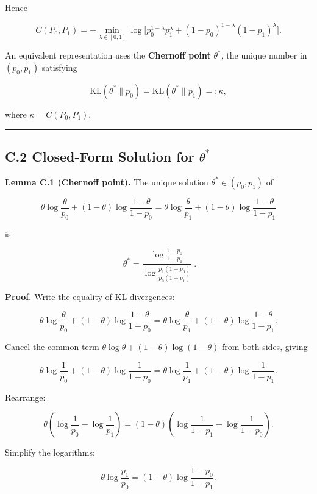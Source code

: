 \documentclass[
  12pt,
]{ctexart}
\begin{document}
Hence

\[
C(P_0,P_1) = -\min_{\lambda\in[0,1]} \log\bigl[p_0^{1-\lambda}p_1^\lambda + (1-p_0)^{1-\lambda}(1-p_1)^\lambda\bigr]. \tag{C.1}
\]

An equivalent representation uses the \textbf{Chernoff point}
\(\theta^*\), the unique number in \((p_0,p_1)\) satisfying

\[
\text{KL}(\theta^*\|p_0) = \text{KL}(\theta^*\|p_1) =: \kappa,
\]

where \(\kappa = C(P_0,P_1)\).

\begin{center}\rule{0.5\linewidth}{0.5pt}\end{center}

\subsection{\texorpdfstring{C.2 Closed-Form Solution for
\(\theta^*\)}{C.2 Closed-Form Solution for \textbackslash theta\^{}*}}\label{c.2-closed-form-solution-for-theta}

\textbf{Lemma C.1 (Chernoff point).} The unique solution
\(\theta^* \in (p_0,p_1)\) of

\[
\theta\log\frac{\theta}{p_0} + (1-\theta)\log\frac{1-\theta}{1-p_0}
= \theta\log\frac{\theta}{p_1} + (1-\theta)\log\frac{1-\theta}{1-p_1}
\]

is

\[
\boxed{\;
\theta^* = \frac{\displaystyle\log\frac{1-p_0}{1-p_1}}
                 {\displaystyle\log\frac{p_1(1-p_0)}{p_0(1-p_1)}}\;}. \tag{C.2}
\]

\textbf{Proof.} Write the equality of KL divergences:

\[
\theta\log\frac{\theta}{p_0} + (1-\theta)\log\frac{1-\theta}{1-p_0}
= \theta\log\frac{\theta}{p_1} + (1-\theta)\log\frac{1-\theta}{1-p_1}.
\]

Cancel the common term \(\theta\log\theta + (1-\theta)\log(1-\theta)\)
from both sides, giving

\[
\theta\log\frac{1}{p_0} + (1-\theta)\log\frac{1}{1-p_0}
= \theta\log\frac{1}{p_1} + (1-\theta)\log\frac{1}{1-p_1}.
\]

Rearrange:

\[
\theta\left(\log\frac{1}{p_0} - \log\frac{1}{p_1}\right)
= (1-\theta)\left(\log\frac{1}{1-p_1} - \log\frac{1}{1-p_0}\right).
\]

Simplify the logarithms:

\[
\theta\log\frac{p_1}{p_0} = (1-\theta)\log\frac{1-p_0}{1-p_1}.
\]
\end{document}
